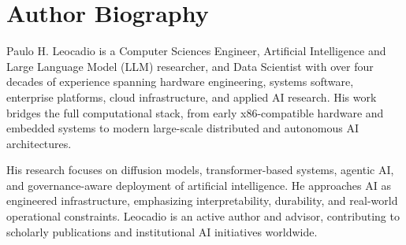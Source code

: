 \author{
Paulo H. Leocadio\\
\small Computer Sciences Engineer; Artificial Intelligence and LLM Researcher; Data Scientist\\
\small Independent Researcher and Author\\
\small \texttt{ph@sculpit.xyz}
}

\section*{Author Biography}

Paulo H. Leocadio is a Computer Sciences Engineer, Artificial Intelligence and Large Language Model (LLM) researcher, 
and Data Scientist with over four decades of experience spanning hardware engineering, systems software, enterprise platforms, 
cloud infrastructure, and applied AI research. His work bridges the full computational stack, 
from early x86-compatible hardware and embedded systems to modern large-scale distributed and autonomous AI architectures.      


His research focuses on diffusion models, transformer-based systems, agentic AI, and governance-aware deployment of artificial intelligence. 
He approaches AI as engineered infrastructure, emphasizing interpretability, durability, and real-world operational constraints. 
Leocadio is an active author and advisor, contributing to scholarly publications and institutional AI initiatives worldwide.
